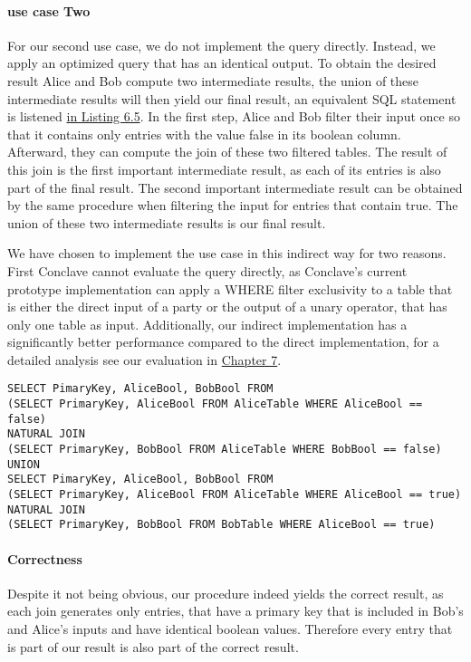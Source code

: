 \paragraph{use case Two}
For our second use case, we do not implement the query directly. Instead, we apply an optimized query that has an identical output. To obtain the desired result Alice and Bob compute two intermediate results, the union of these intermediate results will then yield our final result, an equivalent SQL statement is listened \hyperref[use_case2_alternative_sql]{ in Listing 6.5}.
In the first step, Alice and Bob filter their input once so that it contains only entries with the value false in its boolean column. Afterward, they can compute the join of these two filtered tables. The result of this join is the first important intermediate result, as each of its entries is also part of the final result. The second important intermediate result can be obtained by the same procedure when filtering the input for entries that contain true.
The union of these two intermediate results is our final result. 

We have chosen to implement the use case in this indirect way for two reasons. First Conclave cannot evaluate the query directly, as Conclave's current prototype implementation can apply a WHERE filter exclusivity to a table that is either the direct input of a party or the output of a unary operator, that has only one table as input. Additionally, our indirect implementation has a significantly better performance compared to the direct implementation, for a detailed analysis see our evaluation in \hyperref[evaluation]{Chapter 7}.   


\label{use_case2_alternative_sql}
\begin{lstlisting}[caption={Functional equivalent SQL statement for our optimitized implementation of our second use case}]
SELECT PimaryKey, AliceBool, BobBool FROM
(SELECT PrimaryKey, AliceBool FROM AliceTable WHERE AliceBool == false) 
NATURAL JOIN	
(SELECT PrimaryKey, BobBool FROM AliceTable WHERE BobBool == false)	
UNION
SELECT PimaryKey, AliceBool, BobBool FROM
(SELECT PrimaryKey, AliceBool FROM AliceTable WHERE AliceBool == true) 
NATURAL JOIN	
(SELECT PrimaryKey, BobBool FROM BobTable WHERE AliceBool == true)
\end{lstlisting}

\paragraph{Correctness}
Despite it not being obvious, our procedure indeed yields the correct result, as each join generates only entries, that have a primary key that is included in Bob's and Alice's inputs and have identical boolean values. Therefore every entry that is part of our result is also part of the correct result.

